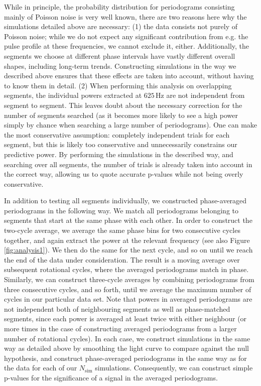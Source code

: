 \documentclass{emulateapj}
\begin{document}
While in principle, the probability distribution for periodograms consisting mainly of Poisson noise is very well known, there are two reasons here why the simulations detailed above are necessary: (1) the data consists not purely of Poisson noise; while we do not expect any significant contribution from e.g. the pulse profile at these frequencies, we cannot exclude it, either. Additionally, the segments we choose at different phase intervals have vastly different overall shapes, including long-term trends. Constructing simulations in the way we described above ensures that these effects are taken into account, without having to know them in detail. (2) When performing this analysis on overlapping segments, the individual powers extracted at $625 \, \mathrm{Hz}$ are not independent from segment to segment. This leaves doubt about the necessary correction for the number of segments searched (as it becomes more likely to see a high power simply by chance when searching a large number of periodograms). One can make the most conservative assumption: completely independent trials for each segment, but this is likely too conservative and unnecessarily constrains our predictive power. By performing the simulations in the described way, and searching over all segments, the number of trials is already taken into account in the correct way, allowing us to quote accurate p-values while not being overly conservative.

In addition to testing all segments individually, we constructed phase-averaged periodograms in the following way. We match all periodograms belonging to segments that start at the same phase with each other. In order to construct the two-cycle average, we average the same phase bins for two consecutive cycles together, and again extract the power at the relevant frequency (see also Figure \ref{fig:analysis1}). We then do the same for the next cycle, and so on until we reach the end of the data under consideration. The result is a moving average over subsequent rotational cycles, where the averaged periodograms match in phase.
Similarly, we can construct three-cycle averages by combining periodograms from three consecutive cycles, and so forth, until we average the maximum number of cycles in our particular data set.  
Note that powers in averaged periodograms are not independent both of neighbouring segments as well as phase-matched segments, since each power is averaged at least twice with either neighbour (or more times in the case of constructing averaged periodograms from a larger number of rotational cycles). 
In each case, we construct simulations in the same way as detailed above by smoothing the light curve to compare against the null hypothesis, and construct phase-averaged periodograms in the same way as for the data for each of our $N_\mathrm{sim}$ simulations. Consequently, we can construct simple p-values for the significance of a signal in the averaged periodograms. 
\end{document}

